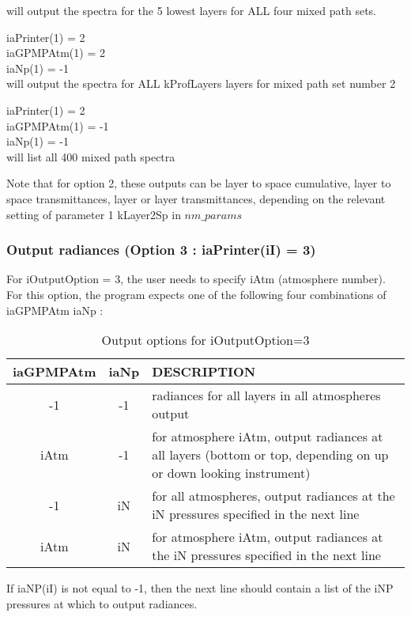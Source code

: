 \documentclass[12pt]{article}
\newcommand{\ttab}{\indent\indent}
\newlength{\colwidth}
\begin{document}
{{\smallskip\noindent
will output the spectra for the 5 lowest layers for ALL four mixed path sets.

\medskip
\medskip
\ttab iaPrinter(1) = 2\\
\ttab iaGPMPAtm(1) = 2\\
\ttab iaNp(1)      = -1\\

\smallskip\noindent
will output the spectra for ALL kProfLayers layers for mixed path set number 2

\medskip
\medskip
\ttab iaPrinter(1) = 2\\
\ttab iaGPMPAtm(1) = -1\\
\ttab iaNp(1)      = -1\\

\smallskip\noindent
will list all 400 mixed path spectra

\medskip
Note that for option 2, these outputs can be layer to space cumulative, 
layer to space transmittances, layer or layer transmittances, depending on 
the relevant setting of parameter 1 {\sf kLayer2Sp} in $nm\_params$

\subsubsection{Output radiances (Option 3 : iaPrinter(iI) = 3)}

\vspace{0.1in}
\noindent For iOutputOption = 3, the user needs to specify iAtm (atmosphere 
number). For this option, the program expects one of the following 
four combinations of {\sf iaGPMPAtm iaNp} : \\
\vspace{0.2in}
\begin{small}
\begin{longtable}{|c|c|p{\colwidth}|} 
\caption{Output options for iOutputOption=3}\\
\hline
iaGPMPAtm & iaNp & DESCRIPTION\\ \hline
-1  & -1  & radiances for all layers in all atmospheres output\\ \hline
iAtm & -1  & for atmosphere iAtm, output radiances at all layers (bottom or
             top, depending on up or down looking instrument) \\ \hline
-1   & iN  & for all atmospheres, output radiances at the iN pressures    
             specified  in the next line\\ \hline
iAtm &  iN  & for atmosphere iAtm, output radiances at the iN pressures   
              specified in the next line\\ \hline
\end{longtable}
\end{small}
If iaNP(iI) is not equal to -1, then the next line should contain a 
list of the iNP pressures at which to output radiances.

}}
\end{document}
